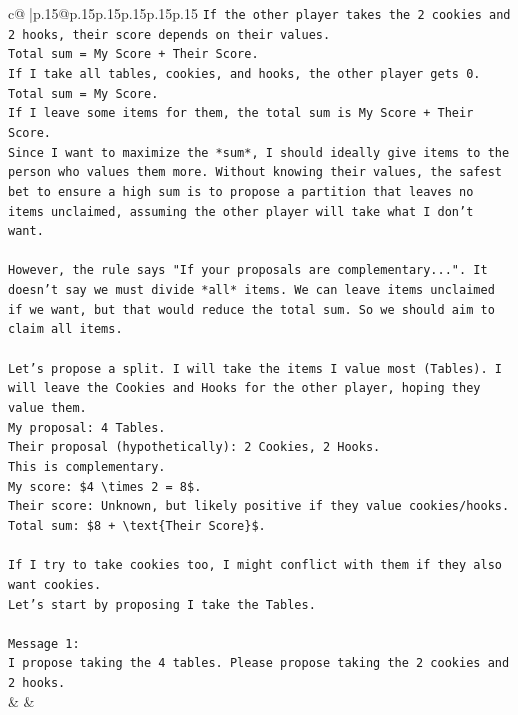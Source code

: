 \documentclass{article}
\begin{document}
{\begin{supertabular}{c@{$\;$}|p{.15\linewidth}@{}p{.15\linewidth}p{.15\linewidth}p{.15\linewidth}p{.15\linewidth}p{.15\linewidth}}
{{{\texttt{If the other player takes the 2 cookies and 2 hooks, their score depends on their values.} \\
\texttt{Total sum = My Score + Their Score.} \\
\texttt{If I take all tables, cookies, and hooks, the other player gets 0. Total sum = My Score.} \\
\texttt{If I leave some items for them, the total sum is My Score + Their Score.} \\
\texttt{Since I want to maximize the *sum*, I should ideally give items to the person who values them more. Without knowing their values, the safest bet to ensure a high sum is to propose a partition that leaves no items unclaimed, assuming the other player will take what I don't want.} \\
\\ 
\texttt{However, the rule says "If your proposals are complementary...". It doesn't say we must divide *all* items. We can leave items unclaimed if we want, but that would reduce the total sum. So we should aim to claim all items.} \\
\\ 
\texttt{Let's propose a split. I will take the items I value most (Tables). I will leave the Cookies and Hooks for the other player, hoping they value them.} \\
\texttt{My proposal: 4 Tables.} \\
\texttt{Their proposal (hypothetically): 2 Cookies, 2 Hooks.} \\
\texttt{This is complementary.} \\
\texttt{My score: \$4 \textbackslash{}times 2 = 8\$.} \\
\texttt{Their score: Unknown, but likely positive if they value cookies/hooks.} \\
\texttt{Total sum: \$8 + \textbackslash{}text\{Their Score\}\$.} \\
\\ 
\texttt{If I try to take cookies too, I might conflict with them if they also want cookies.} \\
\texttt{Let's start by proposing I take the Tables.} \\
\\ 
\texttt{Message 1:} \\
\texttt{I propose taking the 4 tables. Please propose taking the 2 cookies and 2 hooks.} \\
            }
        }
    }
    & & \\ \\


\end{supertabular}}
\end{document}
